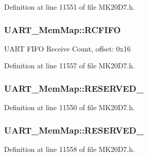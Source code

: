 Definition at line 11551 of file M\+K20\+D7.\+h.

\subsubsection[{\texorpdfstring{R\+C\+F\+I\+FO}{RCFIFO}}]{ U\+A\+R\+T\+\_\+\+Mem\+Map\+::\+R\+C\+F\+I\+FO}\hypertarget{struct_u_a_r_t___mem_map_a3aab8170680196924f67d6810013bb88}{}\label{struct_u_a_r_t___mem_map_a3aab8170680196924f67d6810013bb88}
U\+A\+RT F\+I\+FO Receive Count, offset\+: 0x16 

Definition at line 11557 of file M\+K20\+D7.\+h.

\subsubsection[{\texorpdfstring{R\+E\+S\+E\+R\+V\+E\+D\+\_\+0}{RESERVED_0}}]{ U\+A\+R\+T\+\_\+\+Mem\+Map\+::\+R\+E\+S\+E\+R\+V\+E\+D\+\_}\hypertarget{struct_u_a_r_t___mem_map_a89ef9ce5f134c676178035fbb968fb28}{}\label{struct_u_a_r_t___mem_map_a89ef9ce5f134c676178035fbb968fb28}


Definition at line 11550 of file M\+K20\+D7.\+h.

\subsubsection[{\texorpdfstring{R\+E\+S\+E\+R\+V\+E\+D\+\_\+1}{RESERVED_1}}]{ U\+A\+R\+T\+\_\+\+Mem\+Map\+::\+R\+E\+S\+E\+R\+V\+E\+D\+\_}\hypertarget{struct_u_a_r_t___mem_map_a661d719e57d02c9b80c77aafe270df3c}{}\label{struct_u_a_r_t___mem_map_a661d719e57d02c9b80c77aafe270df3c}


Definition at line 11558 of file M\+K20\+D7.\+h.

